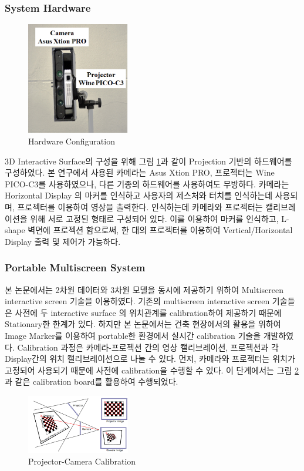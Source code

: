 \subsubsection{System Hardware}
\begin{figure}[ht!]
	\centering
    \includegraphics[width=0.4\textwidth]{3-System/hardware}
	\caption{Hardware Configuration}
    \label{fig:hardware}
\end{figure}
3D Interactive Surface의 구성을 위해 그림 \ref{fig:hardware}과 같이 Projection 기반의 하드웨어를 구성하였다. 본 연구에서 사용된 카메라는 Asus Xtion PRO, 프로젝터는 Wine PICO-C3를 사용하였으나, 다른 기종의 하드웨어를 사용하여도 무방하다. 카메라는 Horizontal Display 의 마커를 인식하고 사용자의 제스처와 터치를 인식하는데 사용되며, 프로젝터를 이용하여 영상을 출력한다. 인식하는데 카메라와 프로젝터는 캘리브레이션을 위해 서로 고정된 형태로 구성되어 있다. 이를 이용하여 마커를 인식하고, L-shape 벽면에 프로젝션 함으로써, 한 대의 프로젝터를 이용하여 Vertical/Horizontal Display 출력 및 제어가 가능하다.

\subsubsection{Portable Multiscreen System}
본 논문에서는 2차원 데이터와 3차원 모델을 동시에 제공하기 위하여 Multiscreen interactive screen 기술을 이용하였다. 기존의 multiscreen interactive screen 기술들은 사전에 두 interactive surface 의 위치관계를 calibration하여 제공하기 때문에 Stationary한 한계가 있다. 하지만 본 논문에서는 건축 현장에서의 활용을 위하여 Image Marker를 이용하여 portable한 환경에서 실시간 calibration 기술을 개발하였다. Calibration 과정은 카메라-프로젝션 간의 영상 캘리브레이션, 프로젝션과 각 Display간의 위치 캘리브레이션으로 나눌 수 있다. 
먼저, 카메라와 프로젝터는 위치가 고정되어 사용되기 때문에 사전에 calibration을 수행할 수 있다. 이 단계에서는 그림 \ref{fig:procam_calibration}과 같은 calibration board를 활용하여 수행되었다.
\begin{figure}[ht!]
	\centering
    \includegraphics[width=0.4\textwidth]{3-System/calibration1}
	\caption{Projector-Camera Calibration}
    \label{fig:procam_calibration}
\end{figure}

